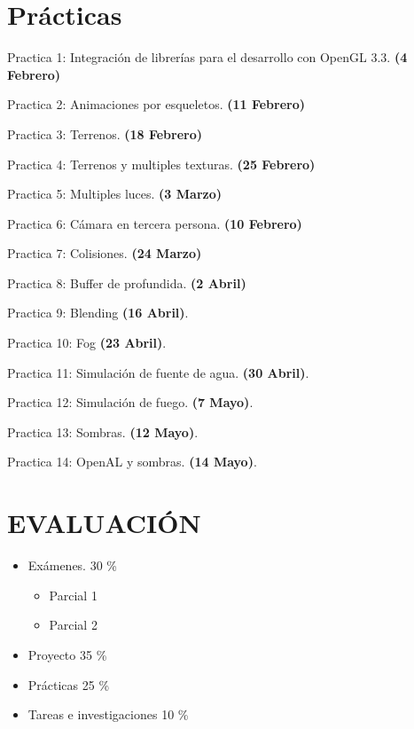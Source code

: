 \documentclass[a4paper,11pt]{article}
\theoremstyle{mytheor}
\begin{document}
\section*{Prácticas}
\begin{legal}
	\item Practica 1: Integración de librerías para el desarrollo con OpenGL 3.3. \textbf{(4 Febrero)}
	\item Practica 2: Animaciones por esqueletos. \textbf{(11 Febrero)}
	\item Practica 3: Terrenos. \textbf{(18 Febrero)}
	\item Practica 4: Terrenos y multiples texturas. \textbf{(25 Febrero)}
	\item Practica 5: Multiples luces. \textbf{(3 Marzo)}
	\item Practica 6: Cámara en tercera persona. \textbf{(10 Febrero)}
	\item Practica 7: Colisiones. \textbf{(24 Marzo)}
	\item Practica 8: Buffer de profundida. \textbf{(2 Abril)}
	\item Practica 9: Blending \textbf{(16 Abril)}.
	\item Practica 10: Fog \textbf{(23 Abril)}.
	\item Practica 11: Simulación de fuente de agua. \textbf{(30 Abril)}.
	\item Practica 12: Simulación de fuego. \textbf{(7 Mayo)}.
	\item Practica 13: Sombras. \textbf{(12 Mayo)}.
	\item Practica 14: OpenAL y sombras. \textbf{(14 Mayo)}.
\end{legal}


\section*{EVALUACIÓN}

\begin{itemize}
	\item Exámenes.	30 \%
	\begin{itemize}
		\item Parcial 1
		\item Parcial 2
	\end{itemize}
	\item Proyecto 35 \%
	\item Prácticas 25 \%
	\item Tareas e investigaciones 10 \%
\end{itemize}
\end{document}
